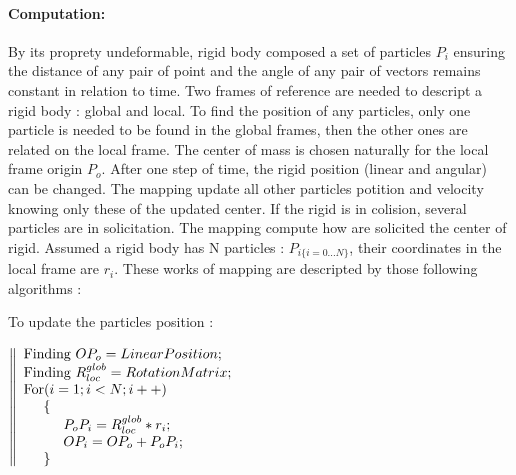 \documentclass[a4paper,10pt]{article}
\begin{document}
\paragraph{Computation: }By its proprety undeformable, rigid body composed a set of particles $P_i$ ensuring the distance of any pair of point and the angle of any pair of vectors remains constant in relation to time. Two frames of reference are needed to descript a rigid body : global and local. To find the position of any particles, only one particle is needed to be found in the global frames, then the other ones are related on the local frame. The center of mass is chosen naturally for the local frame origin $P_o$. After one step of time, the rigid position (linear and angular) can be changed. The mapping update all other particles potition and velocity knowing only these of the updated center. If the rigid is in colision, several particles are in solicitation. The mapping compute how are solicited the center of rigid. Assumed a rigid body has N particles : $P_{i\{i=0...N\}}$, their coordinates in the local frame are $r_i$. These works of mapping are descripted by those following algorithms :
\begin{center} To update the particles position :\end{center}
$
\left\|
  \begin{array}{lll}
  \text{Finding  } OP_o=LinearPosition; \\
  \text{Finding  } R^{glob}_{loc}=RotationMatrix; \\
  \text{For} (i=1;i<N;i++) \\
    \hspace{0.5cm} \{ \\
    \hspace{1cm} P_oP_i=R^{glob}_{loc}*r_i;\\
    \hspace{1cm} OP_i=OP_o+P_oP_i;\\
    \hspace{0.5cm} \} 
  \end{array}
\right.
$
\end{document}
